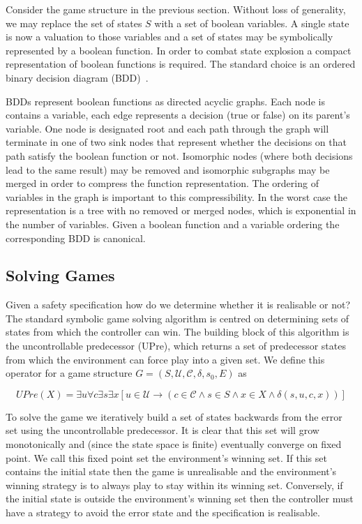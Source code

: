 Consider the game structure in the previous section. Without loss of generality, we may replace the set of states $S$ with a set of boolean variables. A single state is now a valuation to those variables and a set of states may be symbolically represented by a boolean function. In order to combat state explosion a compact representation of boolean functions is required. The standard choice is an ordered binary decision diagram (BDD)~\cite{Bryant86}.

BDDs represent boolean functions as directed acyclic graphs. Each node is contains a variable, each edge represents a decision (true or false) on its parent's variable. One node is designated root and each path through the graph will terminate in one of two sink nodes that represent whether the decisions on that path satisfy the boolean function or not. Isomorphic nodes (where both decisions lead to the same result) may be removed and isomorphic subgraphs may be merged in order to compress the function representation. The ordering of variables in the graph is important to this compressibility. In the worst case the representation is a tree with no removed or merged nodes, which is exponential in the number of variables. Given a boolean function and a variable ordering the corresponding BDD is canonical.

\subsection{Solving Games}

Given a safety specification how do we determine whether it is realisable or not? The standard symbolic game solving algorithm is centred on determining sets of states from which the controller can win. The building block of this algorithm is the uncontrollable predecessor (UPre), which returns a set of predecessor states from which the environment can force play into a given set. We define this operator for a game structure $G = (S, \mathcal{U}, \mathcal{C}, \delta, s_0, E)$ as 

$$UPre(X) = \exists u \forall c \exists s \exists x [u \in \mathcal{U} \to (c \in \mathcal{C} \land s \in S \land x \in X \land \delta(s, u, c, x))]$$

To solve the game we iteratively build a set of states backwards from the error set using the uncontrollable predecessor. It is clear that this set will grow monotonically and (since the state space is finite) eventually converge on fixed point. We call this fixed point set the environment's winning set. If this set contains the initial state then the game is unrealisable and the environment's winning strategy is to always play to stay within its winning set. Conversely, if the initial state is outside the environment's winning set then the controller must have a strategy to avoid the error state and the specification is realisable.

